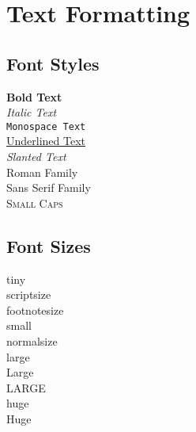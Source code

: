 \begingroup
\raggedright
\section{Text Formatting}


\subsection{Font Styles}
\textbf{Bold Text} \\
\textit{Italic Text} \\
\texttt{Monospace Text} \\
\underline{Underlined Text} \\
\textsl{Slanted Text} \\
\textrm{Roman Family} \\
\textsf{Sans Serif Family} \\
\textrm{\textsc{Small Caps}}


\subsection{Font Sizes}
{\tiny tiny} \\
{\scriptsize scriptsize} \\
{\footnotesize footnotesize} \\
{\small small} \\
{\normalsize normalsize} \\
{\large large} \\
{\Large Large} \\
{\LARGE LARGE} \\
{\huge huge} \\
{\Huge Huge}


\endgroup
